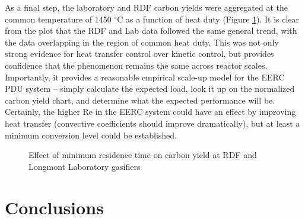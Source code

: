 \documentclass[11pt,twocolumn]{article}
\begin{document}

As a final step, the laboratory and RDF carbon yields were aggregated at the common temperature of 1450 $^{\circ}$C as a function of heat duty (Figure \ref{fig-Agg-Xg-dH-1450}).  It is clear from the plot that the RDF and Lab data followed the same general trend, with the data overlapping in the region of common heat duty.  This was not only strong evidence for heat transfer control over kinetic control, but provides confidence that the phenomenon remains the same across reactor scales.  Importantly, it provides a reasonable empirical scale-up model for the EERC PDU system -- simply calculate the expected load, look it up on the normalized carbon yield chart, and determine what the expected performance will be.  Certainly, the higher Re in the EERC system could have an effect by improving heat transfer (convective coefficients should improve dramatically), but at least a minimum conversion level could be established.

\begin{figure}[hp]

\caption{Effect of minimum residence time on carbon yield at RDF and Longmont Laboratory gasifiers}
\label{fig-Agg-Xg-dH-1450}
\end{figure}


\section*{Conclusions}
\end{document}
